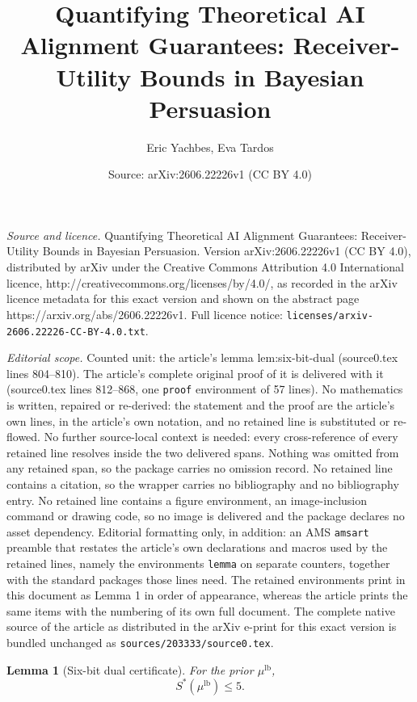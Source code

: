 \documentclass[10pt,a4paper]{amsart}
\title{Quantifying Theoretical AI Alignment Guarantees: Receiver-Utility Bounds in Bayesian Persuasion}
\author{Eric Yachbes, Eva Tardos}
\date{Source: arXiv:2606.22226v1 (CC BY 4.0)}
\newtheorem{lemma}{Lemma}
\begin{document}
\maketitle

\noindent\emph{Source and licence.} Quantifying Theoretical AI Alignment Guarantees: Receiver-Utility Bounds in Bayesian Persuasion. Version arXiv:2606.22226v1 (CC BY 4.0), distributed by arXiv under the Creative Commons Attribution 4.0 International licence, http://creativecommons.org/licenses/by/4.0/, as recorded in the arXiv licence metadata for this exact version and shown on the abstract page https://arxiv.org/abs/2606.22226v1. Full licence notice: \texttt{licenses/arxiv-2606.22226-CC-BY-4.0.txt}.\par\smallskip

\noindent\textit{Editorial scope.} Counted unit: the article's lemma lem:six-bit-dual (source0.tex lines 804--810). The article's complete original proof of it is delivered with it (source0.tex lines 812--868, one \texttt{proof} environment of 57 lines). No mathematics is written, repaired or re-derived: the statement and the proof are the article's own lines, in the article's own notation, and no retained line is substituted or re-flowed.  No further source-local context is needed: every cross-reference of every retained line resolves inside the two delivered spans.  Nothing was omitted from any retained span, so the package carries no omission record.  No retained line contains a citation, so the wrapper carries no bibliography and no bibliography entry.  No retained line contains a figure environment, an image-inclusion command or drawing code, so no image is delivered and the package declares no asset dependency.  Editorial formatting only, in addition: an AMS \texttt{amsart} preamble that restates the article's own declarations and macros used by the retained lines, namely the environments \texttt{lemma} on separate counters, together with the standard packages those lines need.  The retained environments print in this document as Lemma 1 in order of appearance, whereas the article prints the same items with the numbering of its own full document.  The complete native source of the article as distributed in the arXiv e-print for this exact version is bundled unchanged as \texttt{sources/203333/source0.tex}.
\begin{lemma}[Six-bit dual certificate]
\label{lem:six-bit-dual}
For the prior $\mu^{\mathrm{lb}}$,
\[
S^*(\mu^{\mathrm{lb}})\leq 5.
\]
\end{lemma}
\end{document}
